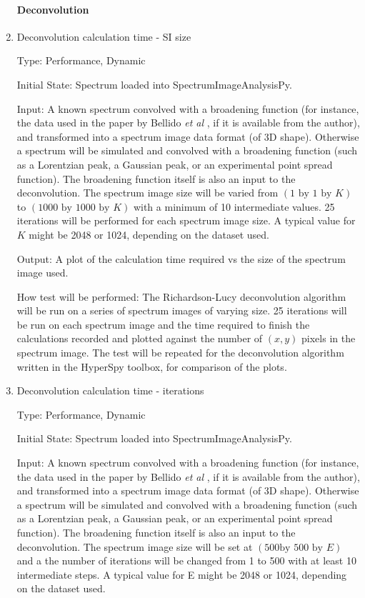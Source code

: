 \documentclass[12pt, titlepage]{article}
\newcommand{\progname}{SpectrumImageAnalysisPy}
\begin{document}
\begin{enumerate}

\paragraph{Deconvolution}
\item{Deconvolution calculation time - SI size}

Type: Performance, Dynamic
					
Initial State: Spectrum loaded into \progname{}.

Input: A known spectrum convolved with a broadening function (for instance, the
data used in the paper by Bellido \textit{et al} \cite{bellido_toward_2014}, if
it is available from the author), and transformed into a spectrum image data
format (of 3D shape). Otherwise a spectrum will be simulated and convolved with
a broadening function (such as a Lorentzian peak, a Gaussian peak, or an
experimental point spread function). The broadening function itself is also an
input to the deconvolution. The spectrum image size will be varied from
$(1\text{ by }1\text{ by }K)$ to $(1000 \text{ by } 1000 \text{ by } K)$ with a
minimum of 10 intermediate values. 25 iterations will be performed for each
spectrum image size. A typical value for $K$ might be 2048 or 1024, depending on
the dataset used.

Output: A plot of the calculation time required vs the size of the spectrum
image used.

How test will be performed: The Richardson-Lucy deconvolution algorithm will be
run on a series of spectrum images of varying size. 25 iterations will be run on
each spectrum image and the time required to finish the calculations recorded
and plotted against the number of $(x, y)$ pixels in the spectrum image. The
test will be repeated for the deconvolution algorithm written in the HyperSpy
toolbox, for comparison of the plots.\\


\item{Deconvolution calculation time - iterations}

Type: Performance, Dynamic
					
Initial State: Spectrum loaded into \progname{}.

Input: A known spectrum convolved with a broadening function (for instance, the
data used in the paper by Bellido \textit{et al} \cite{bellido_toward_2014}, if
it is available from the author), and transformed into a spectrum image data
format (of 3D shape). Otherwise a spectrum will be simulated and convolved with
a broadening function (such as a Lorentzian peak, a Gaussian peak, or an
experimental point spread function). The broadening function itself is also an
input to the deconvolution. The spectrum image size will be set at $(500 \text{
by } 500 \text{ by } E)$ and a the number of iterations will be changed from 1
to 500 with at least 10 intermediate steps. A typical value for E might be 2048
or 1024, depending on the dataset used.


\end{enumerate}
\end{document}
